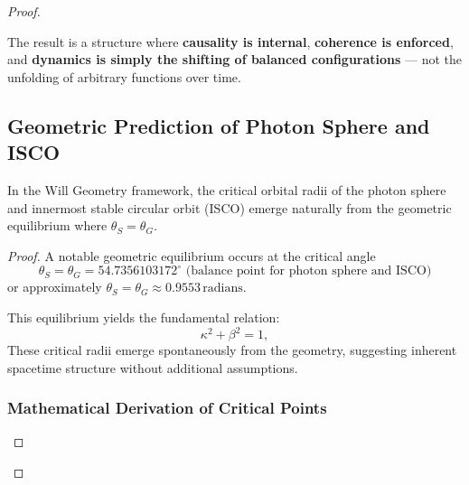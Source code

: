 \documentclass{article}
\begin{document}
\begin{theorem}
\begin{proof}
\begin{center}
\end{center}

The result is a structure where \textbf{causality is internal}, \textbf{coherence is enforced},  
and \textbf{dynamics is simply the shifting of balanced configurations} ---  
not the unfolding of arbitrary functions over time.

\subsection{Geometric Prediction of Photon Sphere and ISCO}

\begin{theorem}
In the Will Geometry framework, the critical orbital radii of the photon sphere and innermost stable circular orbit (ISCO) emerge naturally from the geometric equilibrium where $\theta_S = \theta_G$.
\end{theorem}
\begin{proof}
A notable geometric equilibrium occurs at the critical angle 
\begin{equation}
    \theta_S = \theta_G= 54.7356103172^{\circ} \text{ (balance point for photon sphere and ISCO)}
\end{equation}
or approximately $\theta_S = \theta_G \approx 0.9553\,\text{radians}$.

This equilibrium yields the fundamental relation:
\begin{equation}
\kappa^2 + \beta^2 = 1,
\end{equation}
These critical radii emerge spontaneously from the geometry, suggesting inherent spacetime structure without additional assumptions.

\subsubsection{Mathematical Derivation of Critical Points}


\end{proof}
\end{proof}
\end{theorem}
\end{document}
